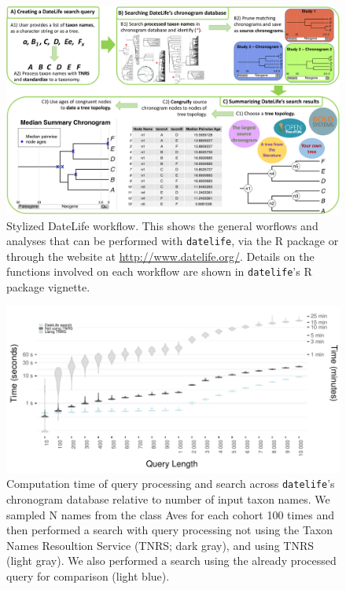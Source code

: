 
\begin{figure}[!h]
\includegraphics{../figures/figure1/figure1-new.pdf}
\caption{Stylized DateLife workflow. This shows the general worflows and analyses that can be performed with \texttt{datelife}, via the R package or through the website  at \url{http://www.datelife.org/}. Details on the functions involved on each workflow are shown in \texttt{datelife}'s R package vignette.
}
\label{fig:workflow}
\end{figure}


\begin{figure}[!h]
\includegraphics[width=1\linewidth]{../figures/fig_runtime_main.pdf}
\caption{Computation time of query processing and search across \texttt{datelife}'s chronogram database relative to number of input taxon names. We sampled N names from the class Aves for each cohort 100 times and then performed a search with query processing not using the Taxon Names Resoultion Service (TNRS; dark gray), and using TNRS (light gray). We also performed a search using the already processed query for comparison (light blue).}
\label{fig:runtime_main}
\end{figure}


